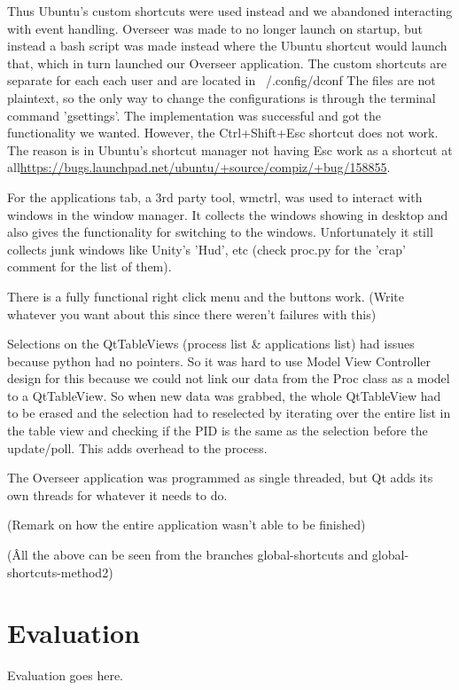 \documentclass[12pt]{article}
\begin{document}
Thus Ubuntu's custom shortcuts were used instead and we abandoned interacting with event handling. Overseer was made to no longer launch on startup, but instead a bash script was made instead where the Ubuntu shortcut would launch that, which in turn launched our Overseer application.
The custom shortcuts are separate for each each user and are located in ~/.config/dconf
The files are not plaintext, so the only way to change the configurations is through the terminal command 'gsettings'.
The implementation was successful and got the functionality we wanted.
However, the Ctrl+Shift+Esc shortcut does not work. The reason is in Ubuntu's shortcut manager not having Esc work as a shortcut at all\url{https://bugs.launchpad.net/ubuntu/+source/compiz/+bug/158855}.

For the applications tab, a 3rd party tool, wmctrl, was used to interact with windows in the window manager.
It collects the windows showing in desktop and also gives the functionality for switching to the windows.
Unfortunately it still collects junk windows like Unity's 'Hud', etc (check proc.py for the 'crap' comment for the list of them).

There is a fully functional right click menu and the buttons work. (Write whatever you want about this since there weren't failures with this)

Selections on the QtTableViews (process list \& applications list) had issues because python had no pointers.
So it was hard to use Model View Controller design for this because we could not link our data from the Proc class as a model to a QtTableView.
So when new data was grabbed, the whole QtTableView had to be erased and the selection had to reselected by iterating over the entire list in the table view and checking if the PID is the same as the selection before the update/poll.
This adds overhead to the process.

The Overseer application was programmed as single threaded, but Qt adds its own threads for whatever it needs to do.

(Remark on how the entire application wasn't able to be finished)



(\^ All the above can be seen from the branches global-shortcuts and global-shortcuts-method2)

	
	
	\section{Evaluation}
	Evaluation goes here.
	
\end{document}
